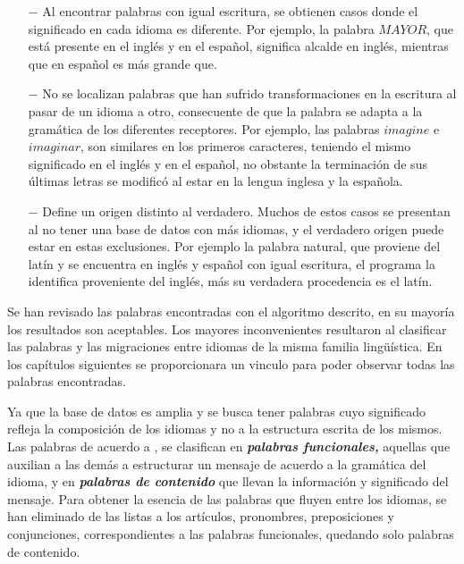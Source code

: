 \begin{itemize}
	
	\item [$-$] Al encontrar palabras con igual escritura, se obtienen casos donde el significado en cada idioma es diferente.  Por ejemplo, la palabra  $\textit{MAYOR}$, que está presente en el inglés y en el español,  significa alcalde en inglés, mientras que en español es más grande que.
	
	\item [$-$] No se localizan palabras que han sufrido transformaciones en la escritura al pasar de un idioma a otro, consecuente de que la palabra se adapta a la gramática de los diferentes receptores.  Por ejemplo, las palabras $\textit{imagine}$ e $\textit{imaginar}$, son similares en los primeros caracteres, teniendo el mismo significado en el inglés y en el español, no obstante la terminación de  sus últimas letras se modificó al estar en  la lengua inglesa y la española. 
	
	\item [$-$] Define un origen distinto al verdadero.  Muchos de estos casos se presentan al no tener una base de datos con más idiomas, y el verdadero origen puede estar en estas exclusiones. Por ejemplo la palabra natural, que proviene del latín y se encuentra en inglés y español con igual escritura,  el programa la identifica proveniente del inglés, más su verdadera procedencia es el latín. 
	
\end{itemize}


Se han revisado las palabras encontradas con el algoritmo descrito, en su mayoría los resultados son aceptables. Los mayores inconvenientes resultaron al clasificar las palabras y las migraciones entre idiomas de la misma familia lingüística.  En los capítulos siguientes se proporcionara un vinculo para poder observar todas las palabras encontradas. 


Ya que  la base de datos es amplia y se busca tener palabras cuyo significado refleja la composición de los idiomas y no a la estructura escrita de los mismos. Las palabras de acuerdo a  \cite{contenidopal}, se clasifican en \textbf{\textit{palabras funcionales,}} aquellas que auxilian a las demás a estructurar un mensaje de acuerdo a la gramática del idioma, y en \textbf{\textit{palabras de contenido}} que llevan la información y significado del mensaje. Para obtener la esencia de las palabras que fluyen entre los idiomas, se han eliminado de las listas a los artículos, pronombres,
preposiciones y conjunciones, correspondientes a las palabras funcionales, quedando solo palabras de contenido. 

